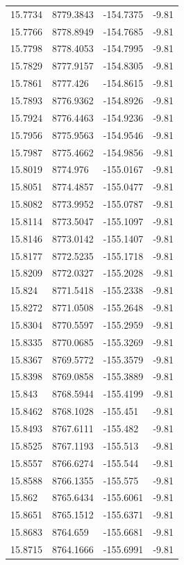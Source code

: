 \begin{table}[H]
\begin{tabular}{llll}
15.7734 & 8779.3843 & -154.7375 & -9.81 \\
15.7766 & 8778.8949 & -154.7685 & -9.81 \\
15.7798 & 8778.4053 & -154.7995 & -9.81 \\
15.7829 & 8777.9157 & -154.8305 & -9.81 \\
15.7861 & 8777.426 & -154.8615 & -9.81 \\
15.7893 & 8776.9362 & -154.8926 & -9.81 \\
15.7924 & 8776.4463 & -154.9236 & -9.81 \\
15.7956 & 8775.9563 & -154.9546 & -9.81 \\
15.7987 & 8775.4662 & -154.9856 & -9.81 \\
15.8019 & 8774.976 & -155.0167 & -9.81 \\
15.8051 & 8774.4857 & -155.0477 & -9.81 \\
15.8082 & 8773.9952 & -155.0787 & -9.81 \\
15.8114 & 8773.5047 & -155.1097 & -9.81 \\
15.8146 & 8773.0142 & -155.1407 & -9.81 \\
15.8177 & 8772.5235 & -155.1718 & -9.81 \\
15.8209 & 8772.0327 & -155.2028 & -9.81 \\
15.824 & 8771.5418 & -155.2338 & -9.81 \\
15.8272 & 8771.0508 & -155.2648 & -9.81 \\
15.8304 & 8770.5597 & -155.2959 & -9.81 \\
15.8335 & 8770.0685 & -155.3269 & -9.81 \\
15.8367 & 8769.5772 & -155.3579 & -9.81 \\
15.8398 & 8769.0858 & -155.3889 & -9.81 \\
15.843 & 8768.5944 & -155.4199 & -9.81 \\
15.8462 & 8768.1028 & -155.451 & -9.81 \\
15.8493 & 8767.6111 & -155.482 & -9.81 \\
15.8525 & 8767.1193 & -155.513 & -9.81 \\
15.8557 & 8766.6274 & -155.544 & -9.81 \\
15.8588 & 8766.1355 & -155.575 & -9.81 \\
15.862 & 8765.6434 & -155.6061 & -9.81 \\
15.8651 & 8765.1512 & -155.6371 & -9.81 \\
15.8683 & 8764.659 & -155.6681 & -9.81 \\
15.8715 & 8764.1666 & -155.6991 & -9.81 \\

\end{tabular}
\end{table}
